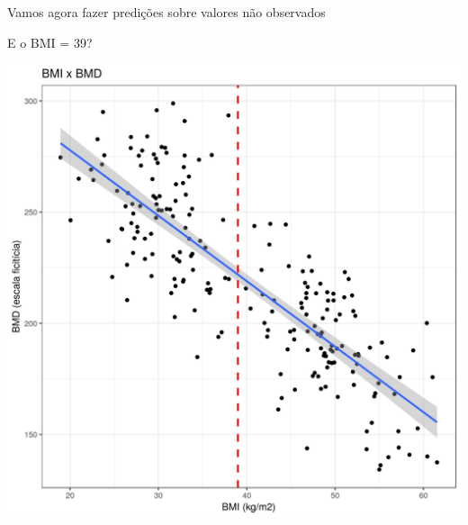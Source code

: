 \documentclass{beamer}
\begin{document}
\begin{frame}
  \begin{center}
    \Large
    Vamos agora fazer predições sobre valores não observados
  \end{center}
\end{frame}

\begin{frame}{E o BMI = 39?}
  \begin{center}
    \includegraphics[height=.9\textheight]{Cap18-19/pratica-rls4}
  \end{center}
\end{frame}
\end{document}
